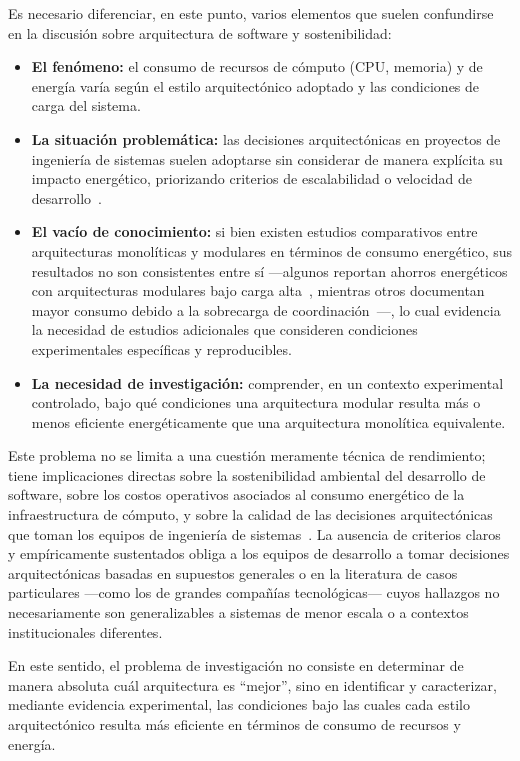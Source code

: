Es necesario diferenciar, en este punto, varios elementos que suelen confundirse en la discusión sobre arquitectura de software y sostenibilidad:
\begin{itemize}
  \item \textbf{El fenómeno:} el consumo de recursos de cómputo (CPU, memoria) y de energía varía según el estilo arquitectónico adoptado y las condiciones de carga del sistema.
  \item \textbf{La situación problemática:} las decisiones arquitectónicas en proyectos de ingeniería de sistemas suelen adoptarse sin considerar de manera explícita su impacto energético, priorizando criterios de escalabilidad o velocidad de desarrollo~\cite{khan2020cloud}.
  \item \textbf{El vacío de conocimiento:} si bien existen estudios comparativos entre arquitecturas monolíticas y modulares en términos de consumo energético, sus resultados no son consistentes entre sí ---algunos reportan ahorros energéticos con arquitecturas modulares bajo carga alta~\cite{capuano2026comparative}, mientras otros documentan mayor consumo debido a la sobrecarga de coordinación~\cite{araujo2024energy}---, lo cual evidencia la necesidad de estudios adicionales que consideren condiciones experimentales específicas y reproducibles.
  \item \textbf{La necesidad de investigación:} comprender, en un contexto experimental controlado, bajo qué condiciones una arquitectura modular resulta más o menos eficiente energéticamente que una arquitectura monolítica equivalente.
\end{itemize}

Este problema no se limita a una cuestión meramente técnica de rendimiento; tiene implicaciones directas sobre la sostenibilidad ambiental del desarrollo de software, sobre los costos operativos asociados al consumo energético de la infraestructura de cómputo, y sobre la calidad de las decisiones arquitectónicas que toman los equipos de ingeniería de sistemas~\cite{kern2018sustainable}. La ausencia de criterios claros y empíricamente sustentados obliga a los equipos de desarrollo a tomar decisiones arquitectónicas basadas en supuestos generales o en la literatura de casos particulares ---como los de grandes compañías tecnológicas--- cuyos hallazgos no necesariamente son generalizables a sistemas de menor escala o a contextos institucionales diferentes.

En este sentido, el problema de investigación no consiste en determinar de manera absoluta cuál arquitectura es ``mejor'', sino en identificar y caracterizar, mediante evidencia experimental, las condiciones bajo las cuales cada estilo arquitectónico resulta más eficiente en términos de consumo de recursos y energía.

